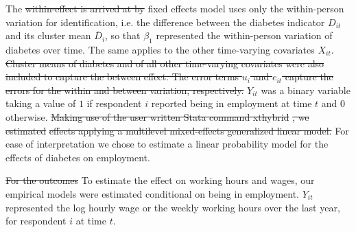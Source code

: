 \documentclass[12pt,english]{article}
\providecommand{\DIFaddtex}[1]{{\protect\color{blue}#1}} %
\providecommand{\DIFdeltex}[1]{{\protect\color{red}\sout{#1}}}                      %
\providecommand{\DIFaddbegin}{} %
\providecommand{\DIFaddend}{} %
\providecommand{\DIFdelbegin}{} %
\providecommand{\DIFdelend}{} %
\providecommand{\DIFadd}[1]{\texorpdfstring{\DIFaddtex{#1}}{#1}} %
\providecommand{\DIFdel}[1]{\texorpdfstring{\DIFdeltex{#1}}{}} %
\begin{document}
The \DIFdelbegin \DIFdel{within-effect is arrived at by }\DIFdelend \DIFaddbegin \DIFadd{fixed effects model uses only the  within-person variation for identification, i.e. }\DIFaddend the difference between the diabetes indicator $D_{it}$ and its cluster mean $\overline{D}_{i}$, so that $\beta_{1}$ represented the within-person variation of diabetes over time. The same applies to the other time-varying covariates $X_{it}$. \DIFdelbegin \DIFdel{Cluster means of diabetes and of all other time-varying covariates were also included to capture the between effect. The error terms $u_{i}$ and $e_{it}$ capture the errors for the within and between variation, respectively. }\DIFdelend $Y_{it}$ was a binary variable taking a value of $1$ if respondent $i$ reported being in employment at time $t$ and $0$ otherwise. \DIFdelbegin \DIFdel{Making use of the user written Stata command xthybrid }%
\DIFdel{, we estimated }%
\DIFdel{effects applying a multilevel mixed-effects generalized linear model. }\DIFdelend For ease of interpretation we chose to estimate a linear probability model for the effects of diabetes on employment.

\DIFdelbegin \DIFdel{For the outcomes }\DIFdelend \DIFaddbegin \DIFadd{To estimate the effect on }\DIFaddend working hours and wages, our empirical models were estimated conditional on being in employment. $Y_{it}$ represented the log hourly wage or the weekly working hours over the last year, for respondent $i$ at time $t$.
\end{document}
